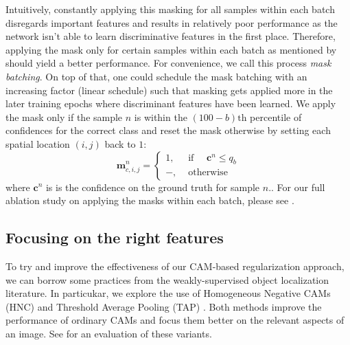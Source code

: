 Intuitively, constantly applying this masking for all samples within each batch disregards important features and results in relatively poor performance as the network isn't able to learn discriminative features in the first place. Therefore, applying the mask only for certain samples within each batch as mentioned by \citet[Secton~3.3]{huang2020selfchallenging} should yield a better performance. For convenience, we call this process \emph{mask batching}. On top of that, one could schedule the mask batching with an increasing factor (\eg linear schedule) such that masking gets applied more in the later training epochs where discriminant features have been learned. We apply the mask only if the sample $n$ is within the $(100-b)\mathrm{th}$ percentile of confidences for the correct class and reset the mask otherwise by setting each spatial location $(i,j)$ back to $1$:
\begin{equation}
    \mathbf{m}^n_{c,i,j}=\left\{\begin{array}{ll}
1, & \text { if } \quad \mathbf{c}^n \leq q_{b} \\
-, & \text { otherwise }
\end{array}\right.
\label{eq:MaskingReversion}
\end{equation}
 where $ \mathbf{c}^n$ is is the confidence on the ground truth for sample $n$.. For our full ablation study on applying the masks within each batch, please see .

\subsection{Focusing on the right features}
To try and improve the effectiveness of our CAM-based regularization approach, we can borrow some practices from the weakly-supervised object localization literature. In particukar, we explore the use of Homogeneous Negative CAMs (HNC) \citep{sun2020fixing} and Threshold Average Pooling (TAP) \citep{Bae2020RethinkingCAM}. Both methods improve the performance of ordinary CAMs and focus them better on the relevant aspects of an image. See  for an evaluation of these variants.


